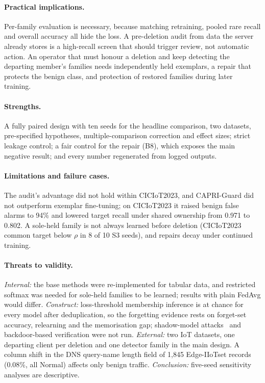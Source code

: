 \documentclass[pdflatex,sn-mathphys-num,iicol]{sn-jnl}
\begin{document}
\paragraph{Practical implications.} Per-family evaluation is necessary, because matching retraining, pooled rare recall and overall accuracy all hide the loss. A pre-deletion audit from data the server already stores is a high-recall screen that should trigger review, not automatic action. An operator that must honour a deletion and keep detecting the departing member's families needs independently held exemplars, a repair that protects the benign class, and protection of restored families during later training.

\paragraph{Strengths.} A fully paired design with ten seeds for the headline comparison, two datasets, pre-specified hypotheses, multiple-comparison correction and effect sizes; strict leakage control; a fair control for the repair (B8), which exposes the main negative result; and every number regenerated from logged outputs.

\paragraph{Limitations and failure cases.} The audit's advantage did not hold within CICIoT2023, and CAPRI-Guard did not outperform exemplar fine-tuning; on CICIoT2023 it raised benign false alarms to 94\% and lowered target recall under shared ownership from 0.971 to 0.802. A sole-held family is not always learned before deletion (CICIoT2023 common target below $\rho$ in 8 of 10 S3 seeds), and repairs decay under continued training.

\paragraph{Threats to validity.} \emph{Internal:} the base methods were re-implemented for tabular data, and restricted softmax was needed for sole-held families to be learned; results with plain FedAvg would differ. \emph{Construct:} loss-threshold membership inference is at chance for every model after deduplication, so the forgetting evidence rests on forget-set accuracy, relearning and the memorisation gap; shadow-model attacks~\cite{shokri2017} and backdoor-based verification were not run. \emph{External:} two IoT datasets, one departing client per deletion and one detector family in the main design. A column shift in the DNS query-name length field of 1{,}845 Edge-IIoTset records (0.08\%, all Normal) affects only benign traffic. \emph{Conclusion:} five-seed sensitivity analyses are descriptive.
\end{document}
